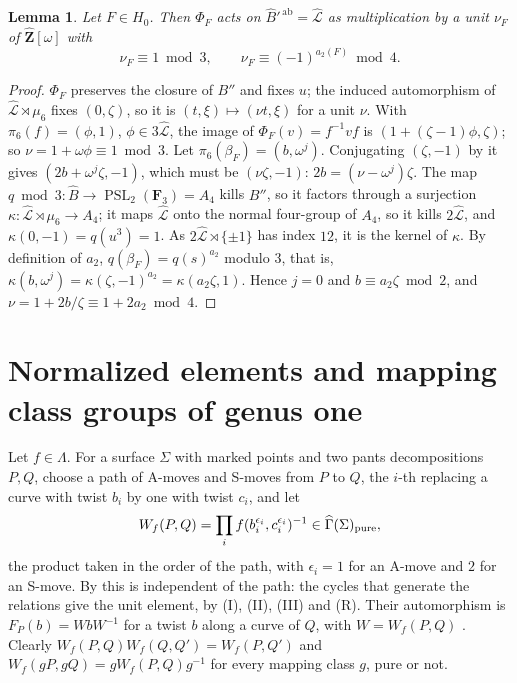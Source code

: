 \documentclass[11pt,a4paper]{article}
\theoremstyle{plain}
\newtheorem{lemma}[theorem]{Lemma}
\theoremstyle{definition}
\theoremstyle{remark}
\newcommand{\Zh}{\widehat{\mathbf Z}}
\newcommand{\F}{\mathbf F}
\newcommand{\Bh}{\widehat B}
\newcommand{\Gh}{\widehat\Gamma}
\newcommand{\PSL}{\operatorname{PSL}}
\newcommand{\ab}{\mathrm{ab}}
\begin{document}
\begin{lemma}\label{lem:unit}
Let $F\in H_0$. Then $\Phi_F$ acts on $\Bh'^{\,\ab}=\widehat{\mathcal L}$ as multiplication by a unit $\nu_F$ of
$\Zh[\omega]$ with
\[
 \nu_F\equiv1\bmod3,\qquad \nu_F\equiv(-1)^{a_2(F)}\bmod4 .
\]
\end{lemma}

\begin{proof}
$\Phi_F$ preserves the closure of $B''$ and fixes $u$; the induced automorphism of
$\widehat{\mathcal L}\rtimes\mu_6$ fixes $(0,\zeta)$, so it is $(t,\xi)\mapsto(\nu t,\xi)$ for a unit $\nu$.
With $\pi_6(f)=(\phi,1)$, $\phi\in3\widehat{\mathcal L}$, the image of $\Phi_F(v)=f^{-1}vf$ is
$(1+(\zeta-1)\phi,\zeta)$; so $\nu=1+\omega\phi\equiv1\bmod3$. Let $\pi_6(\beta_F)=(b,\omega^j)$. Conjugating
$(\zeta,-1)$ by it gives $(2b+\omega^j\zeta,-1)$, which must be $(\nu\zeta,-1)$: $2b=(\nu-\omega^j)\zeta$. The
map $q\bmod3:\Bh\to\PSL_2(\F_3)=A_4$ kills $B''$, so it factors through a surjection
$\kappa:\widehat{\mathcal L}\rtimes\mu_6\to A_4$; it maps $\widehat{\mathcal L}$ onto the normal four-group of $A_4$, so it kills $2\widehat{\mathcal L}$, and
$\kappa(0,-1)=q(u^{3})=1$. As $2\widehat{\mathcal L}\rtimes\{\pm1\}$ has index $12$, it is the kernel of
$\kappa$. By definition of
$a_2$, $q(\beta_F)=q(s)^{a_2}$ modulo $3$, that is, $\kappa(b,\omega^j)=\kappa(\zeta,-1)^{a_2}=\kappa(a_2\zeta,1)$.
Hence $j=0$ and $b\equiv a_2\zeta\bmod2$, and $\nu=1+2b/\zeta\equiv1+2a_2\bmod4$.
\end{proof}

\section{Normalized elements and mapping class groups of genus one}\label{sec:genusone}

Let $f\in\Lambda$. For a surface $\Sigma$ with marked points and two pants decompositions $P,Q$, choose a path of
A-moves and S-moves from $P$ to $Q$, the $i$-th replacing a curve with twist $b_i$ by one with twist $c_i$, and let
\[
 W_f(P,Q)=\prod_i f(b_i^{\epsilon_i},c_i^{\epsilon_i})^{-1}\in\Gh(\Sigma)_{\rm pure},
\]
the product taken in the order of the path, with $\epsilon_i=1$ for an A-move and $2$ for an S-move. By
\cite[Theorem 2 and Lemma 6]{HLS} this is independent of the path: the cycles that generate the relations give
the unit element, by (I), (II), (III) and (R). Their automorphism is $F_P(b)=WbW^{-1}$ for a twist $b$ along a
curve of $Q$, with $W=W_f(P,Q)$ \cite[formula (3)]{HLS}. Clearly $W_f(P,Q)W_f(Q,Q')=W_f(P,Q')$ and
$W_f(gP,gQ)=gW_f(P,Q)g^{-1}$ for every mapping class $g$, pure or not.
\end{document}
